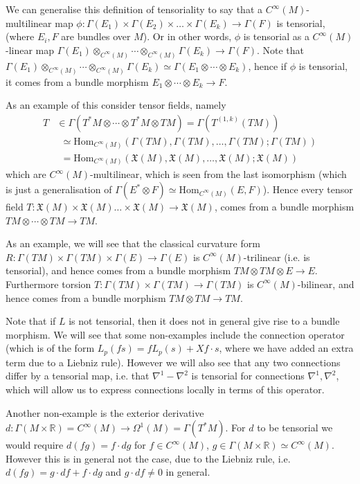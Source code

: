 \documentclass[a4paper]{article}
\theoremstyle{definition} \newtheorem*{definition}{Definition}
\theoremstyle{definition} \newtheorem*{definitions}{Definitions}
\theoremstyle{plain} \newtheorem{theorem}{Theorem}[section]
\theoremstyle{plain} \newtheorem{proposition}[theorem]{Proposition}
\theoremstyle{plain} \newtheorem{corollary}[theorem]{Corollary}
\theoremstyle{plain} \newtheorem{lemma}[theorem]{Lemma}
\theoremstyle{plain} \newtheorem{example}[theorem]{Example}
\newcommand{\realnos}{\mathbb{R}}
\newcommand{\Hom}{\text{Hom}}
\newcommand{\smooth}{C^\infty}
\begin{document}
We can generalise this definition of tensoriality to say that a $\smooth(M)$-multilinear map $\phi:\Gamma(E_1)\times \Gamma(E_2)\times \ldots \times \Gamma(E_k)\to \Gamma(F)$ is tensorial, (where $E_i, F$ are bundles over $M$). Or in other words, $\phi$ is tensorial as a $\smooth(M)$-linear map $\Gamma(E_1)\otimes_{\smooth(M)} \cdots \otimes_{\smooth(M)} \Gamma(E_k)\to \Gamma(F)$. Note that $\Gamma(E_1)\otimes_{\smooth(M)} \cdots \otimes_{\smooth(M)} \Gamma(E_k)\simeq \Gamma(E_1\otimes \cdots \otimes E_k)$, hence if $\phi$ is tensorial, it comes from a bundle morphism $E_1\otimes \cdots \otimes E_k\to F$.

As an example of this consider tensor fields, namely 
\begin{align*}
T & \in \Gamma(T^*M\otimes \cdots \otimes T^*M \otimes TM) = \Gamma(T^{(1, k)}(TM)) \\
& \ \ \simeq \text{Hom}_{\smooth(M)}(\Gamma(TM), \Gamma(TM), \ldots, \Gamma(TM); \Gamma(TM)) \\
& \ \ = \text{Hom}_{\smooth(M)}(\mathfrak{X}(M), \mathfrak{X}(M), \ldots, \mathfrak{X}(M); \mathfrak{X}(M))
\end{align*}
which are $\smooth(M)$-multilinear, which is seen from the last isomorphism (which is just a generalisation of $\Gamma(E^*\otimes F)\simeq \Hom_{\smooth (M)}(E, F)$). Hence every tensor field  $T:\mathfrak{X}(M)\times \mathfrak{X}(M) \ldots \times \mathfrak{X}(M)\to \mathfrak{X}(M)$, comes from a bundle morphism $TM\otimes \cdots \otimes TM\to TM$.

As an example, we will see that the classical curvature form $R:\Gamma(TM)\times \Gamma(TM) \times \Gamma(E)\to \Gamma(E)$ is $\smooth(M)$-trilinear (i.e. is tensorial), and hence comes from a bundle morphism $TM\otimes TM\otimes E\to E$. Furthermore torsion $T:\Gamma(TM)\times \Gamma(TM)\to \Gamma(TM)$ is $\smooth (M)$-bilinear, and hence comes from a bundle morphism $TM\otimes TM\to TM$.

Note that if $L$ is not tensorial, then it does not in general give rise to a bundle morphism. We will see that some non-examples include the connection operator (which is of the form $L_p(fs)=fL_p(s)+X f\cdot s$, where we have added an extra term due to a Liebniz rule). However we will also see that any two connections differ by a tensorial map, i.e. that $\nabla^1-\nabla^2$ is tensorial for connections $\nabla^1, \nabla^2$, which will allow us to express connections locally in terms of this operator. 

Another non-example is the exterior derivative $d:\Gamma(M\times \realnos)=\smooth(M)\to \Omega^1(M)=\Gamma(T^*M)$. For $d$ to be tensorial we would require $d(fg)=f\cdot dg$ for $f\in \smooth(M)$, $g\in \Gamma(M\times \realnos)\simeq \smooth(M)$. However this is in general not the case, due to the Liebniz rule, i.e. $d(fg)=g\cdot df + f\cdot dg$ and $g\cdot df\neq 0$ in general. 
\end{document}
